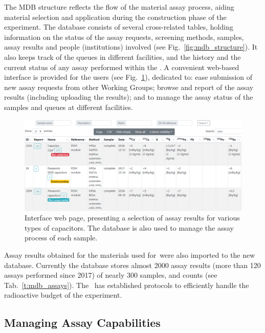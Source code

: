 The MDB structure reflects the flow of the material assay process, aiding material selection and application during the construction phase of the experiment. The database consists of several cross-related tables, holding information on the status of the assay requests, screening methods, samples, assay results and people (institutions) involved (see Fig.~\ref{fig:mdb_structure}). It also keeps track of the queues in different facilities, and the history and the current status of any assay performed within the \MAWG. A convenient web-based interface is provided for the users (see Fig.~\ref{fig:mdb_results}), dedicated to: ease submission of new assay requests from other Working Groups; browse and report of the assay results (including uploading the results); and to manage the assay status of the samples and queues at different facilities.

\begin{figure}[!t]
\center\includegraphics[width=\textwidth]{./Figures/mdb_results.png}
\caption[Web interface of \DSks\ materials database]{Interface web page, presenting a selection of assay results for various types of capacitors. The database is also used to manage the assay process of each sample.}
\label{fig:mdb_results}
\end{figure} 

Assay results obtained for the materials used for \DSfs\,were also imported to the new database. Currently the database stores almost 2000 assay results (more than 120 assays performed since 2017) of nearly 300 samples, and counts (see Tab.~\ref{t:mdb_assays}). The \MAWG\ has established protocols to efficiently handle the radioactive budget of the experiment.


\subsection{Managing Assay Capabilities}
\label{sec:MatAssay-RadiopurityManagement}

